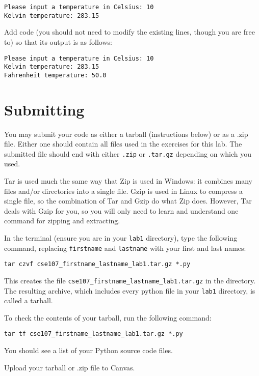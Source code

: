 \documentclass[12pt]{article}
\begin{document}
\begin{lstlisting}[style=c]
Please input a temperature in Celsius: 10
Kelvin temperature: 283.15
\end{lstlisting}

Add code (you should not need to modify the existing lines, though you are free to) so that its output is as follows:

\begin{lstlisting}[style=c]
Please input a temperature in Celsius: 10
Kelvin temperature: 283.15
Fahrenheit temperature: 50.0
\end{lstlisting}



\section{Submitting}

You may submit your code as either a tarball (instructions below) or as a .zip file. Either one should contain all files used in the exercises for this lab. The submitted file should end with either \texttt{.zip} or \texttt{.tar.gz} depending on which you used.

Tar is used much the same way that Zip is used in Windows: it combines many files and/or directories into a single file. Gzip is used in Linux to compress a single file, so the combination of Tar and Gzip do what Zip does. However, Tar deals with Gzip for you, so you will only need to learn and understand one command for zipping and extracting.

In the terminal (ensure you are in your \texttt{lab1} directory), type the following command, replacing \texttt{firstname} and \texttt{lastname} with your first and last names:

\begin{lstlisting}[style=bash]
tar czvf cse107_firstname_lastname_lab1.tar.gz *.py
\end{lstlisting}

This creates the file \texttt{cse107\_firstname\_lastname\_lab1.tar.gz} in the directory. The resulting archive, which includes every python file in your \texttt{lab1} directory, is called a tarball. 

To check the contents of your tarball, run the following command:

\begin{lstlisting}[style=bash]
tar tf cse107_firstname_lastname_lab1.tar.gz *.py
\end{lstlisting}

You should see a list of your Python source code files.

Upload your tarball or .zip file to Canvas.
\end{document}

